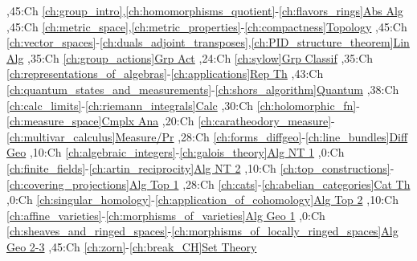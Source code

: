 
\bgroup
\renewcommand{\href}[1]{} %
\hypersetup{linkcolor=black} %
\renewcommand{\solidwidth}{0.7pt}
\renewcommand{\boldwidth}{1.5pt}

\setcounter{diagheight}{50}
\begin{chart}
,45:{Ch \ref*{ch:group_intro},\ref*{ch:homomorphisms_quotient}-\ref*{ch:flavors_rings}}{\hyperref[part:absalg]{Abs Alg}}{}
,45:{Ch \ref*{ch:metric_space},\ref*{ch:metric_properties}-\ref*{ch:compactness}}{\hyperref[part:basictop]{Topology}}{}
,45:{Ch \ref*{ch:vector_spaces}-\ref*{ch:duals_adjoint_transposes},\ref*{ch:PID_structure_theorem}}{\hyperref[part:linalg]{Lin Alg}}{}
,35:{Ch \ref*{ch:group_actions}}{\hyperref[part:groups]{Grp Act}}{}
,24:{Ch \ref*{ch:sylow}}{\hyperref[ch:sylow]{Grp Classif}}{}
,35:{Ch \ref*{ch:representations_of_algebras}-\ref*{ch:applications}}{\hyperref[part:repth]{Rep Th}}{}
,43:{Ch \ref*{ch:quantum_states_and_measurements}-\ref*{ch:shors_algorithm}}{\hyperref[part:quantum]{Quantum}}{}
,38:{Ch \ref*{ch:calc_limits}-\ref*{ch:riemann_integrals}}{\hyperref[part:calc]{Calc}}{}
,30:{Ch \ref*{ch:holomorphic_fn}-\ref*{ch:measure_space}}{\hyperref[part:cmplxana]{Cmplx Ana}}{}
,20:{Ch \ref*{ch:caratheodory_measure}-\ref*{ch:multivar_calculus}}{\hyperref[part:measure]{Measure/Pr}}{}
,28:{Ch \ref*{ch:forms_diffgeo}-\ref*{ch:line_bundles}}{\hyperref[part:diffgeo]{Diff Geo}}{}
,10:{Ch \ref*{ch:algebraic_integers}-\ref*{ch:galois_theory}}{\hyperref[part:algnt1]{Alg NT 1}}{}
,0:{Ch \ref*{ch:finite_fields}-\ref*{ch:artin_reciprocity}}{\hyperref[part:algnt2]{Alg NT 2}}{}
,10:{Ch \ref*{ch:top_constructions}-\ref*{ch:covering_projections}}{\hyperref[part:algtop1]{Alg Top 1}}{}
,28:{Ch \ref*{ch:cats}-\ref*{ch:abelian_categories}}{\hyperref[part:cats]{Cat Th}}{}
,0:{Ch \ref*{ch:singular_homology}-\ref*{ch:application_of_cohomology}}{\hyperref[part:algtop2]{Alg Top 2}}{}
,10:{Ch \ref*{ch:affine_varieties}-\ref*{ch:morphisms_of_varieties}}{\hyperref[part:ag1]{Alg Geo 1}}{}
,0:{Ch \ref*{ch:sheaves_and_ringed_spaces}-\ref*{ch:morphisms_of_locally_ringed_spaces}}{\hyperref[part:ag2]{Alg Geo 2-3}}{}
,45:{Ch \ref*{ch:zorn}-\ref*{ch:break_CH}}{\hyperref[part:st1]{Set Theory}}{}


\end{chart}
